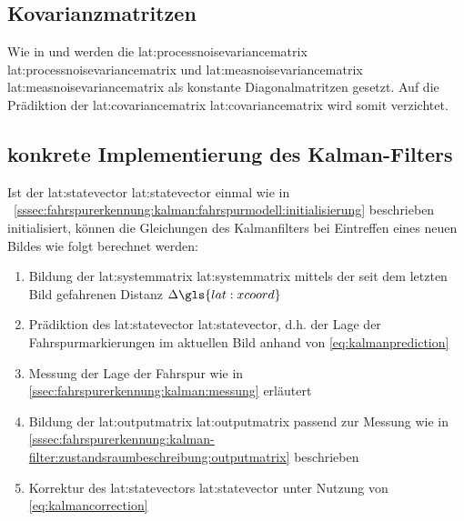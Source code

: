 \subsection{Kovarianzmatritzen}
Wie in \autocite{petersfalkoFPGAbasierteBildverarbeitungspipelineZur2009} und \autocite{risackRobustLaneRecognition} werden die \glsdesc{lat:processnoisevariancematrix} \gls{lat:processnoisevariancematrix} und \glsdesc{lat:measnoisevariancematrix} \gls{lat:measnoisevariancematrix} als konstante Diagonalmatritzen gesetzt. Auf die Prädiktion der \glsdesc{lat:covariancematrix} \gls{lat:covariancematrix} wird somit verzichtet.

\subsection{konkrete Implementierung des Kalman-Filters}
Ist der \glsdesc{lat:statevector} \gls{lat:statevector} einmal wie in ~\ref{sssec:fahrspurerkennung:kalman:fahrspurmodell:initialisierung} beschrieben initialisiert, können die Gleichungen des Kalmanfilters bei Eintreffen eines neuen Bildes wie folgt berechnet werden:
\begin{enumerate}
\item Bildung der \glsdesc{lat:systemmatrix} \gls{lat:systemmatrix} mittels der seit dem letzten Bild gefahrenen Distanz \begin{math} \Delta \gls{lat:xcoord} \end{math}
\item Prädiktion des \glsdesc{lat:statevector} \gls{lat:statevector}, d.h. der Lage der Fahrspurmarkierungen im aktuellen Bild anhand von \eqref{eq:kalmanprediction}
\item Messung der Lage der Fahrspur wie in \ref{ssec:fahrspurerkennung:kalman:messung}
erläutert
\item Bildung der \glsdesc{lat:outputmatrix} \gls{lat:outputmatrix} passend zur Messung wie in \ref{sssec:fahrspurerkennung:kalman-filter:zustandsraumbeschreibung:outputmatrix} beschrieben
\item Korrektur des \glsdesc{lat:statevector}s \gls{lat:statevector} unter Nutzung von \eqref{eq:kalmancorrection}
\end{enumerate}


